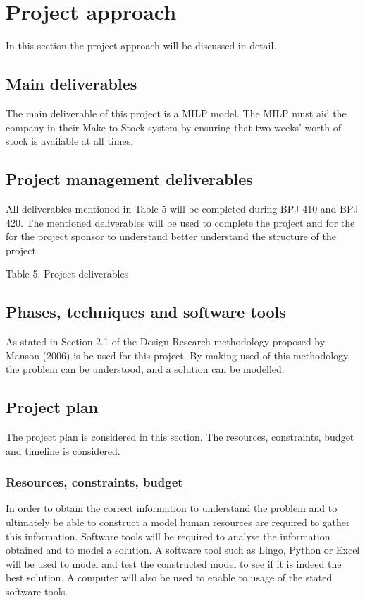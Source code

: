 \documentclass[a4paper,11pt,fleqn]{report}
\begin{document}
\chapter{Project approach}
\acresetall

    In this section the project approach will be discussed in detail.
    
    \section{Main deliverables}
        The main deliverable of this project is a MILP model. The MILP must aid the company in their Make to Stock system by ensuring that two weeks’ worth of stock is available at all times.
    \section{Project management deliverables}
        All deliverables mentioned in Table 5 will be completed during BPJ 410 and BPJ 420. The mentioned deliverables will be used to complete the project and for the for the project sponsor to understand better understand the structure of the project.
        
        Table 5: Project deliverables
        
    \section{Phases, techniques and software tools}
        As stated in Section 2.1 of the Design Research methodology proposed by Manson (2006) is be used for this project. By making used of this methodology, the problem can be understood, and a solution can be modelled.
    \section{Project plan}
        The project plan is considered in this section. The resources, constraints, budget and timeline is considered.
        
        \subsection{Resources, constraints, budget}
            In order to obtain the correct information to understand the problem and to ultimately be able to construct a model human resources are required to gather this information.
            Software tools will be required to analyse the information obtained and to model a solution. A software tool such as Lingo, Python or Excel will be used to model and test the constructed model to see if it is indeed the best solution. A computer will also be used to enable to usage of the stated software tools.
            
\end{document}
